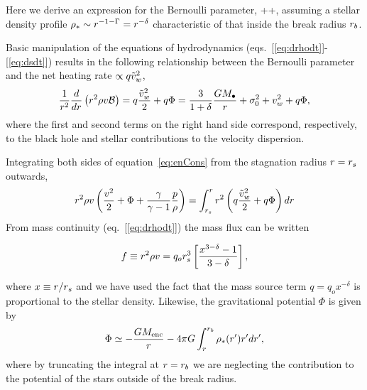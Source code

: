 Here we derive an expression for the Bernoulli parameter, \be
{} \equiv \ke +\gammaf {}+\Phi, \ee assuming a
stellar density profile $\rho_*\sim r^{-1-\Gamma}=r^{-\delta}$
characteristic of that inside the break radius $r_b$.

Basic manipulation of the equations of hydrodynamics
(eqs.~[\ref{eq:drhodt}]-[\ref{eq:dsdt}]) results in the following
relationship between the Bernoulli parameter and the net heating rate
$\propto q \tilde{v}_{w}^{2}$,
\begin{align}
\frac{1}{r^2} \frac{d}{dr} \left(r^2 \rho v \mathcal{B} \right) = q \frac{\tilde{v}_{w}^2}{2} + q \Phi = \frac{3}{1+\delta}\frac{G
  M_{\bullet}}{r}+\sigma_0^2+v_w^2 + q \Phi,
\label{eq:enCons}
\end{align}
where the first and second terms on the right hand side correspond,
respectively, to the black hole and stellar contributions to the
velocity dispersion.

Integrating both sides of equation~\eqref{eq:enCons} from the
stagnation radius $r = r_s$ outwards,
\begin{align}
  r^2 \rho v \left(\frac{v^2}{2}+\Phi+\frac{\gamma}{\gamma-1} \frac{p}{\rho} \right)= \int_{r_s}^{r}
    r^2 \left(q \frac{\tilde{v}_{w}^2}{2} + q\Phi\right) dr
    \label{eq:enConsInt}
\end{align}
From mass continuity (eq.~[\ref{eq:drhodt}]) the mass flux can be
written

\begin{equation}
 f\equiv r^2 \rho v = q_o r_s^3 \left[\frac{x^{3-\delta}-1}{3-\delta}\right],
 \label{eq:massFlux}
 \end{equation}

where $x \equiv r/r_s$ and we have used the fact that the mass
 source term $q = q_o x^{-\delta}$ is proportional to the stellar
 density.  Likewise, the gravitational potential $\Phi$ is given by
\begin{align}
\Phi \simeq -\frac{G M_{\rm enc}}{r} -4 \pi G \int_{r}^{r_b} \rho_*(r') r' dr',
\label{eq:Phi}
\end{align}
where by truncating the integral at $r = r_b$ we are neglecting the
contribution to the potential of the stars outside of the break
radius.

